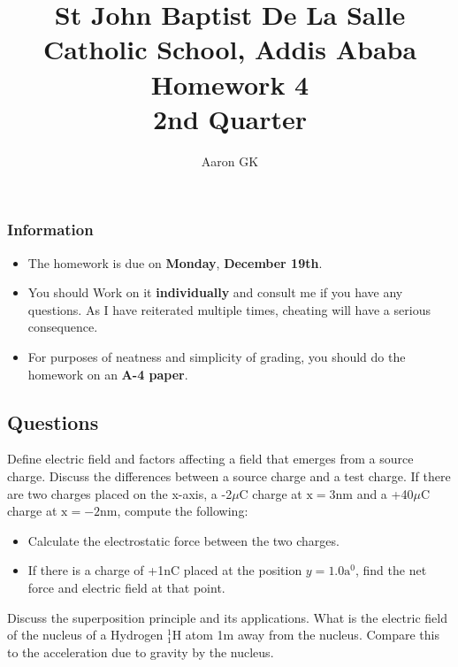 \documentclass[9pt,addpoints]{exam}
\author{Aaron GK}
\begin{document}
	\title{St John Baptist De La Salle Catholic School, Addis Ababa\\
		\large Homework 4 \\
		2nd Quarter}
	\maketitle
	\begin{center}
		\subsubsection*{Information}
		\begin{itemize}
			\item The homework is due on \textbf{Monday}, \textbf{December 19th}.
			\item You should Work on it \textbf{individually} and consult me if you have any questions. As I have reiterated multiple times, cheating will have a serious consequence.
			\item For purposes of neatness and simplicity of grading, you should do the homework on an \textbf{A-4 paper}.
		\end{itemize}
	\end{center}
	\begin{center}
		\subsection*{Questions}
	\end{center}
	
	\begin{questions}
		\question Define electric field and factors affecting a field that emerges from a source charge.
		\question Discuss the differences between a source charge and a test charge.
		\question If there are two charges placed on the x-axis, a -2$\mu\text{C}$ charge at $\text{x}=3\text{nm}$ and a +40$\mu\text{C}$ charge at $\text{x}=-2\text{nm}$, compute the following:
		\begin{itemize}
			\item Calculate the electrostatic force between the two charges.
			\item If there is a charge of +1nC placed at the position $y=1.0\text{a}^0$, find the net force and electric field at that point.
		\end{itemize}
		\question Discuss the superposition principle and its applications.
		\question What is the electric field of the nucleus of a Hydrogen $^1_1\text{H}$ atom 1m away from the nucleus. Compare this to the acceleration due to gravity by the nucleus.
	\end{questions}		
\end{document}
